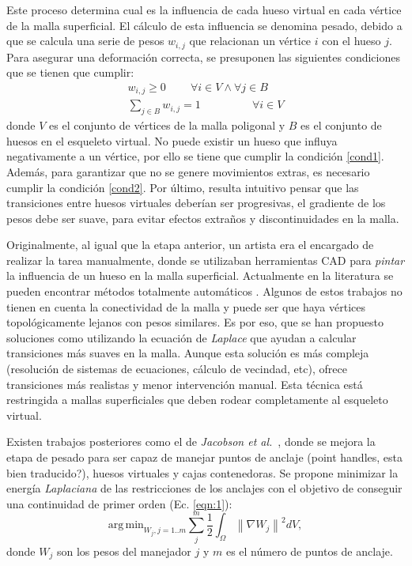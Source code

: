 Este proceso  determina cual es la influencia de cada hueso virtual en cada vértice de la malla superficial. El cálculo de esta influencia se denomina pesado, debido a que se calcula una serie de pesos $w_{i,j}$ que relacionan un vértice $i$ con el hueso $j$.
Para asegurar una deformación correcta, se presuponen las siguientes condiciones que se tienen que cumplir:
\begin{eqnarray}
\label{cond1}
w_{i,j}\geq 0 \;\;\;\;\;\;\;\; \forall i \in V \wedge \forall j \in B   \\
\label{cond2}
\sum_{j \in B} w_{i,j} = 1\ \;\;\;\;\;\;\;\;\;\;\;\;\;\;\;\;
\forall i \in V
\end{eqnarray}
donde $V$ es el conjunto de vértices de la malla poligonal y $B$ es el conjunto de huesos en el esqueleto virtual. No puede existir un hueso que influya negativamente a un vértice, por ello se tiene que cumplir la condición \ref{cond1}. Además, para garantizar que no se genere movimientos extras, es necesario cumplir la condición \ref{cond2}.
Por último, resulta intuitivo pensar que las transiciones entre huesos virtuales deberían ser progresivas, el gradiente de los pesos debe ser suave, para evitar efectos extraños y discontinuidades en la malla.

Originalmente, al igual que la etapa anterior, un artista era el encargado de realizar la tarea manualmente, donde se utilizaban herramientas \ac{CAD} para \emph{pintar} la influencia de un hueso en la malla superficial. Actualmente en la literatura se pueden encontrar métodos totalmente automáticos \cite{huang2013robust,pan2017automatic}. 
Algunos de estos trabajos no tienen en cuenta la conectividad de la malla y puede ser que haya vértices topológicamente lejanos con pesos similares. Es por eso, que se han propuesto soluciones como \cite{Baran:2007} utilizando la ecuación de \emph{Laplace} que ayudan a calcular transiciones más suaves en la malla. Aunque esta solución es más compleja (resolución de sistemas de ecuaciones, cálculo de vecindad, etc), ofrece transiciones más realistas y menor intervención manual. Esta técnica está restringida a mallas superficiales que deben rodear completamente al esqueleto virtual.

Existen trabajos posteriores como el de \emph{Jacobson et al.}~\cite{Jacobson:2011}, donde se mejora la etapa de pesado para ser capaz de manejar puntos de anclaje (point handles, esta bien traducido?), huesos virtuales y cajas contenedoras. Se propone minimizar la energía \emph{Laplaciana} de las restricciones de los anclajes con el objetivo de conseguir una continuidad  de primer orden (Ec. \ref{eqn:1}):
\begin{equation}
\label{eqn:1}
\mathrm{arg\,min}_{W_j, j=1..m}\sum_{j}^m\frac{1}{2}\int_\Omega \left \|  \nabla W_j\right \|^2 dV,
\end{equation}
donde $W_j$ son los pesos del manejador $j$ y $m$ es el número de puntos de anclaje. 

